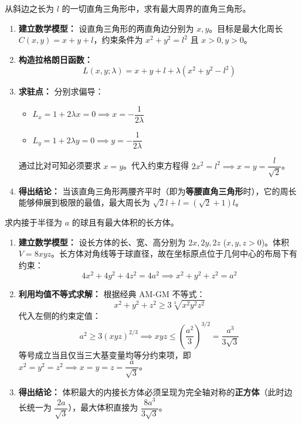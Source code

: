 \documentclass[lang=cn,11pt]{elegantbook}
\begin{document}
\begin{exercise}[几何约束最优化一]
从斜边之长为 $l$ 的一切直角三角形中，求有最大周界的直角三角形。
\end{exercise}

\begin{solution}
\begin{enumerate}
    \item \textbf{建立数学模型：}
    设直角三角形的两直角边分别为 $x, y$。目标是最大化周长 $C(x,y) = x+y+l$，约束条件为 $x^2+y^2=l^2$ 且 $x>0, y>0$。
    \item \textbf{构造拉格朗日函数：}
    \[
    L(x,y;\lambda) = x+y+l + \lambda(x^2+y^2-l^2)
    \]
    \item \textbf{求驻点：}
    分别求偏导：
    \begin{itemize}
        \item $L_x = 1+2\lambda x = 0 \implies x = -\dfrac{1}{2\lambda}$
        \item $L_y = 1+2\lambda y = 0 \implies y = -\dfrac{1}{2\lambda}$
    \end{itemize}
    通过比对可知必须要求 $x=y$。代入约束方程得 $2x^2=l^2 \implies x = y = \dfrac{l}{\sqrt{2}}$。
    
    \item \textbf{得出结论：}
    当该直角三角形两腰齐平时（即为\textbf{等腰直角三角形}时），它的周长能够伸展到极限的最值，最大周长为 $\sqrt{2}l + l = (\sqrt{2}+1)l$。
\end{enumerate}
\end{solution}

\begin{exercise}[几何约束最优化二]
求内接于半径为 $a$ 的球且有最大体积的长方体。
\end{exercise}

\begin{solution}
\begin{enumerate}
    \item \textbf{建立数学模型：}
    设长方体的长、宽、高分别为 $2x, 2y, 2z$ ($x,y,z>0$)。体积 $V = 8xyz$。长方体对角线等于球直径，故在坐标原点位于几何中心的布局下有约束：
    \[
    4x^2+4y^2+4z^2 = 4a^2 \implies x^2+y^2+z^2=a^2
    \]
    
    \item \textbf{利用均值不等式求解：}
    根据经典 AM-GM 不等式：
    \[
    x^2+y^2+z^2 \ge 3\sqrt[3]{x^2y^2z^2}
    \]
    代入左侧的约束定值：
    \[
    a^2 \ge 3(xyz)^{2/3} \implies xyz \le \left(\frac{a^2}{3}\right)^{\!3/2} = \frac{a^3}{3\sqrt{3}}
    \]
    等号成立当且仅当三大基变量均等分约束项，即 $x^2=y^2=z^2 \implies x=y=z=\dfrac{a}{\sqrt{3}}$。
    
    \item \textbf{得出结论：}
    体积最大的内接长方体必须呈现为完全轴对称的\textbf{正方体}（此时边长统一为 $\dfrac{2a}{\sqrt{3}}$），最大体积直接为 $\dfrac{8a^3}{3\sqrt{3}}$。
\end{enumerate}
\end{solution}
\end{document}
